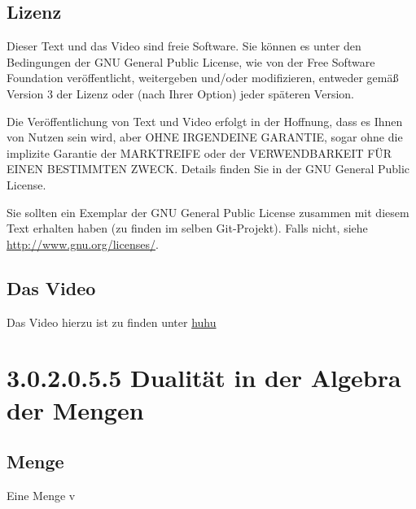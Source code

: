 \documentclass[a4paper]{amsart}
\theoremstyle{definition}
\begin{document}
\subsection*{Lizenz}
Dieser Text und das Video sind freie Software. Sie können es unter den Bedingungen der
GNU General Public License, wie von der Free Software Foundation veröffentlicht, weitergeben
und/oder modifizieren, entweder gemäß Version 3 der Lizenz oder (nach Ihrer Option) jeder späteren Version.

Die Veröffentlichung von Text und Video erfolgt in der Hoffnung, dass es Ihnen von Nutzen sein wird,
aber OHNE IRGENDEINE GARANTIE, sogar ohne die implizite Garantie der MARKTREIFE oder der
VERWENDBARKEIT FÜR EINEN BESTIMMTEN ZWECK. Details finden Sie in der GNU General Public License.

Sie sollten ein Exemplar der GNU General Public License zusammen mit diesem Text erhalten haben
(zu finden im selben Git-Projekt).
Falls nicht, siehe \url{http://www.gnu.org/licenses/}.

\subsection*{Das Video}
Das Video hierzu ist zu finden unter
{\tiny
   \url{huhu}
}

\section{3.0.2.0.5.5 Dualität in der Algebra der Mengen}

\subsection{Menge}
Eine Menge v
 
\end{document}
